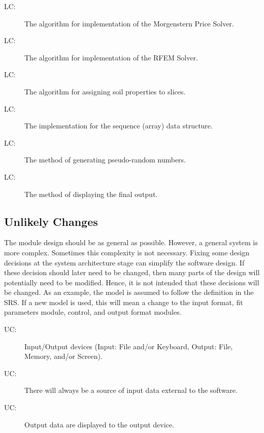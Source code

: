 \documentclass[12pt]{article}
\newcounter{lcnum}
\newcommand{\lcthelcnum}{LC\thelcnum}
\newcounter{ucnum}
\newcommand{\uctheucnum}{UC\theucnum}
\begin{document}
\begin{description}
\item[\lcthelcnum\label{LCmp}:]The algorithm for implementation of the Morgenstern Price Solver.
\end{description}
\begin{description}
\item[\lcthelcnum\label{LCrfem}:]The algorithm for implementation of the RFEM Solver.
\end{description}
\begin{description}
\item[\lcthelcnum\label{LCprop}:]The algorithm for assigning soil properties to slices.
\end{description}
\begin{description}
\item[\lcthelcnum\label{LCarray}:]The implementation for the sequence (array) data structure.
\end{description}
\begin{description}
\item[\lcthelcnum\label{LCrand}:]The method of generating pseudo-random numbers.
\end{description}
\begin{description}
\item[\lcthelcnum\label{LCplot}:]The method of displaying the final output.
\end{description}
\subsection{Unlikely Changes}
\label{Sec:UnliChan}
The module design should be as general as possible. However, a general system is more complex. Sometimes this complexity is not necessary. Fixing some design decisions at the system architecture stage can simplify the software design. If these decision should later need to be changed, then many parts of the design will potentially need to be modified. Hence, it is not intended that these decisions will be changed.  As an example, the model is assumed to follow the definition in the SRS.  If a new model is used, this will mean a change to the input format, fit parameters module, control, and output format modules.
\begin{description}
\item[\uctheucnum\label{UCIO}:]Input/Output devices (Input: File and/or Keyboard, Output: File, Memory, and/or Screen).
\end{description}
\begin{description}
\item[\uctheucnum\label{UCinputsource}:]There will always be a source of input data external to the software.
\end{description}
\begin{description}
\item[\uctheucnum\label{UCoutput}:]Output data are displayed to the output device.
\end{description}
\end{document}
